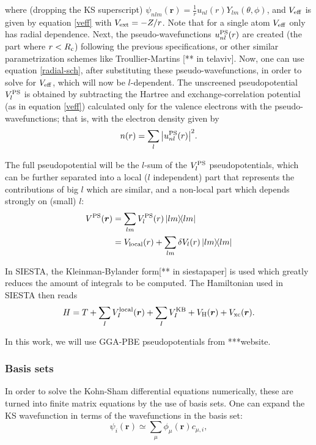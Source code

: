 where (dropping the KS superscript) \(\psi_{nlm}(\bm r)=\frac 1 r u_{nl}(r)Y_{lm}(\theta,\phi)\), and \(V_{\mathrm{eff}}\) is given by equation \ref{veff} with \(V_{\mathrm{ext}}=-Z/r\). Note that for a single atom \(V_{\mathrm{eff}}\) only has radial dependence. Next, the pseudo-wavefunctions \(u_{nl}^{\mathrm{PS}}(r)\) are created (the part where \(r < R_{\mathrm{c}}\)) following the previous specifications, or other similar parametrization schemes like Troullier-Martins [** in telaviv]. Now, one can use equation \ref{radial-sch}, after substituting these pseudo-wavefunctions, in order to solve for \(V_{\mathrm{eff}}\), which will now be \(l\)-dependent. The unscreened pseudopotential \(V^{\mathrm{PS}}_l\) is obtained by subtracting the Hartree and exchange-correlation potential (as in equation \ref{veff}) calculated only for the valence electrons with the pseudo-wavefunctions; that is, with the electron density given by
\begin{equation}
n(r)=\sum_{l}\abs{u_{nl}^{\mathrm{PS}}(r)}^2.
\end{equation}

The full pseudopotential will be the \(l\)-sum of the \(V^{\mathrm{PS}}_l\) pseudopotentials, which can be further separated into a local (\(l\) independent) part that represents the contributions of big \(l\) which are similar, and a non-local part which depends strongly on (small) \(l\):
\begin{equation}
\begin{split}
V^{\mr{PS}}(\bm r) &= \sum_{lm}V_l^{\mr{PS}}(r)\dyad{lm}\\
&=V_{\mr{local}}(r)+\sum_{lm}\delta V_l(r)\dyad{lm}
\end{split}
\end{equation}

In SIESTA, the Kleinman-Bylander form[** in siestapaper] is used which greatly reduces the amount of integrals to be computed. The Hamiltonian used in SIESTA then reads
\begin{equation}
\label{hsiesta}
	H=T+\sum_{I} V_{I}^{\mathrm{local}}(\bm{r})+\sum_{I} V_{I}^{\mathrm{KB}}+V_{\mathrm{H}}(\bm{r})+V_{\mathrm{xc}}(\bm{r}).
\end{equation}

In this work, we will use GGA-PBE pseudopotentials from ***website.


\subsubsection*{Basis sets}

In order to solve the Kohn-Sham differential equations numerically, these are turned into finite matrix equations by the use of basis sets. One can expand the KS wavefunction in terms of the wavefunctions in the basis set:
\begin{equation}
\psi_i(\bm r) \simeq \sum_\mu\phi_\mu(\bm r)c_{\mu,i},
\end{equation}

